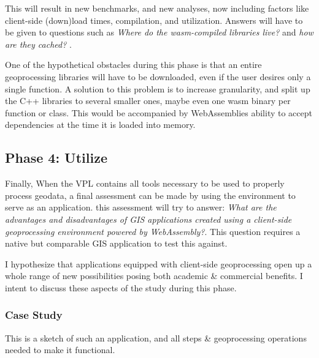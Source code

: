 This will result in new benchmarks, and new analyses, now including factors like client-side (down)load times, compilation, and utilization. Answers will have to be given to questions such as \textit{Where do the wasm-compiled libraries live?} and \textit{ how are they cached? }.

One of the hypothetical obstacles during this phase is that an entire geoprocessing libraries will have to be downloaded, even if the user desires only a single function. A solution to this problem is to increase granularity, and split up the C++ libraries to several smaller ones, maybe even one wasm binary per function or class. This would be accompanied by WebAssemblies ability to accept dependencies at the time it is loaded into memory. 




\subsection{Phase 4: Utilize}

Finally, When the VPL contains all tools necessary to be used to properly process geodata, a final assessment can be made by using the environment to serve as an application. this assessment will try to answer: \textit{What are the advantages and disadvantages of GIS applications created using a client-side geoprocessing environment powered by WebAssembly?}. This question requires a native but comparable GIS application to test this against.  


I hypothesize that applications equipped with client-side geoprocessing open up a whole range of new possibilities posing both academic \& commercial benefits. 
I intent to discuss these aspects of the study during this phase. 




\subsubsection*{Case Study}

This is a sketch of such an application, and all steps \& geoprocessing operations needed to make it functional.

